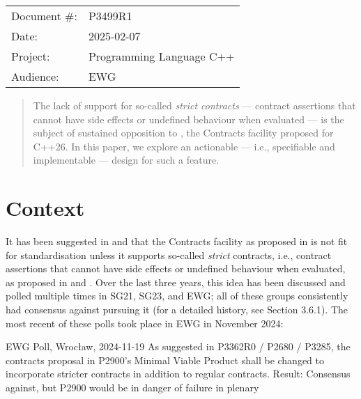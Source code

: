 \begin{tabular}{ll}
Document \#: & P3499R1 \\
Date: &2025-02-07 \\
Project: & Programming Language C++ \\
Audience: & EWG
\end{tabular}

\begin{abstract}
The lack of support for so-called \emph{strict contracts} --- contract assertions that cannot have side effects or undefined behaviour when evaluated --- is the subject of sustained opposition to \cite{P2900R13}, the Contracts facility proposed for C++26. In this paper, we explore an actionable --- i.e., specifiable and implementable --- design for such a feature.
\end{abstract}







\section{Context}

It has been suggested in \cite{P3173R0} and \cite{P3362R0} that the Contracts facility as proposed in \cite{P2900R13} is not fit for standardisation unless it supports so-called \emph{strict} contracts, i.e., contract assertions that cannot have side effects or undefined behaviour when evaluated, as proposed in \cite{P2680R1} and \cite{P3285R0}. Over the last three years, this idea has been discussed and polled multiple times in SG21, SG23, and EWG; all of these groups consistently had consensus against pursuing it (for a detailed history, see \cite{P2899R0} Section 3.6.1). The most recent of these polls took place in EWG in November 2024:

\vspace{2mm}
\begin{wgpoll}{{EWG Poll, Wroc{\l}aw, 2024-11-19}}
As suggested in P3362R0 / P2680 / P3285, the contracts proposal in P2900’s Minimal Viable Product shall be changed to incorporate stricter contracts in addition to regular contracts.
Result: Consensus against, but P2900 would be in danger of failure in plenary
\end{wgpoll}
\vspace{2mm}

